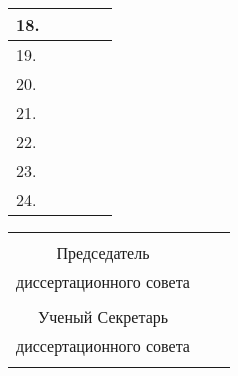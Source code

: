 \begin{longtable}{|l|p{5.1cm}|p{5cm}|l|l|}
	18. & \dcMemberFifteenFullFIO & \dcMemberFifteenRegaliaFull & &  \\	\hline
	19. & \dcMemberSixteenFullFIO & \dcMemberSixteenRegaliaFull &  &  \\	\hline
	20. & \dcMemberSeventeenFullFIO & \dcMemberSeventeenRegaliaFull & &  \\ \hline
	21. & \dcMemberEighteenFullFIO & \dcMemberEighteenRegaliaFull	 & &  \\ 	\hline
	22. & \dcMemberNineteenFullFIO & \dcMemberNineteenRegaliaFull & &  \\ 	\hline
	23. & \dcMemberTwentyFullFIO & \dcMemberTwentyRegaliaFull & &  \\ 	\hline
	24. & \dcMemberTwentyOneFullFIO & \dcMemberTwentyOneRegaliaFull & &  \\ 	\hline
	\hline
\end{longtable}





\begin{center}
	\begin{tabular}[c]{c m{4cm} l}
		
		&            &                                         \\
		Председатель     &            &                                         \\
		диссертационного совета  & \hrulefill & \dcHeadFullFIO		                    \\
		\dcHeadRegalia      &            &                                         \\
		Ученый Секретарь   &            &                                   \\
		диссертационного совета  & \hrulefill & \dcSecretaryFullFIO						    \\
		\dcSecretaryRegalia  &  		  & 			   							\\
		
	\end{tabular}
\end{center}

\clearpage

